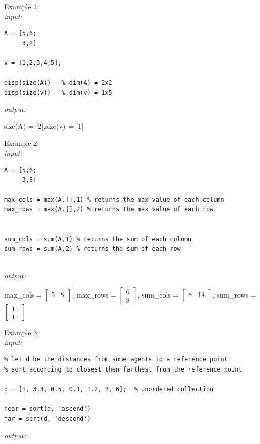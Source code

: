 \documentclass[../MATLAB_Primer.tex]{subfiles}
\begin{document}
Example 1:\\

\textit{input:}
\begin{lstlisting}
A = [5,6;
     3,8]

v = [1,2,3,4,5]; 

disp(size(A))   % dim(A) = 2x2
disp(size(v))   % dim(v) = 1x5
\end{lstlisting}
\textit{output:}

\begin{center}
    size(A) = [2],\quad size(v) = [1]
\end{center}

Example 2:\\

\textit{input:}
\begin{lstlisting}
A = [5,6;
     3,8]

max_cols = max(A,[],1) % returns the max value of each column
max_rows = max(A,[],2) % returns the max value of each row 


sum_cols = sum(A,1) % returns the sum of each column
sum_rows = sum(A,2) % returns the sum of each row 


\end{lstlisting}
\textit{output:}

\begin{center}
    max\_cols =
    $\begin{bmatrix}
     5 & 8\\
    \end{bmatrix}$,\quad
   max\_rows =
    $\begin{bmatrix}
     6\\8
    \end{bmatrix}$,\quad
    sum\_cols =
    $\begin{bmatrix}
     8 & 14\\
    \end{bmatrix}$,\quad
    sum\_rows =
    $\begin{bmatrix}
     11 \\ 11
    \end{bmatrix}$
\end{center}

Example 3:\\

\textit{input:}
\begin{lstlisting}
% let d be the distances from some agents to a reference point
% sort according to closest then farthest from the reference point

d = [1, 3.3, 0.5, 0.1, 1.2, 2, 6];  % unordered collection

near = sort(d, 'ascend')
far = sort(d, 'descend')

\end{lstlisting}
\textit{output:}
\end{document}
